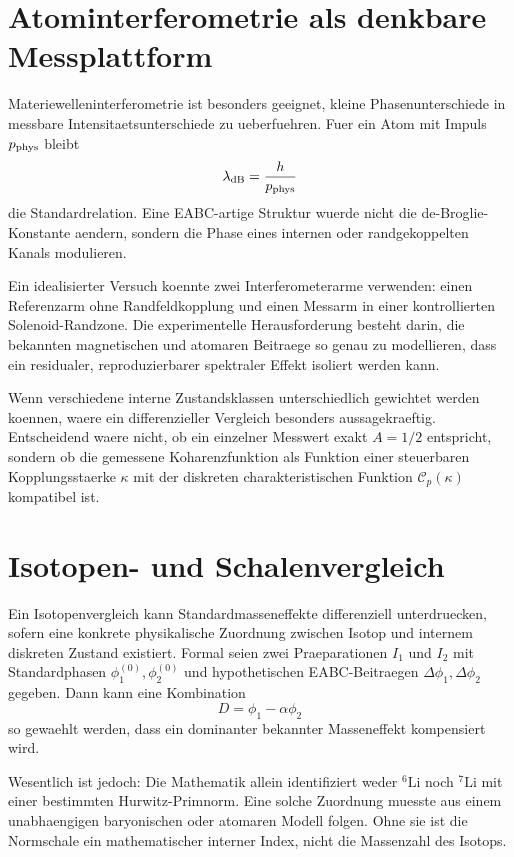 \documentclass[11pt,a4paper]{article}
\theoremstyle{definition}
\begin{document}
\section{Atominterferometrie als denkbare Messplattform}
Materiewelleninterferometrie ist besonders geeignet, kleine Phasenunterschiede in messbare Intensitaetsunterschiede zu ueberfuehren. Fuer ein Atom mit Impuls $p_{\rm phys}$ bleibt
\[
\lambda_{\rm dB}=\frac{h}{p_{\rm phys}}
\]
die Standardrelation. Eine EABC-artige Struktur wuerde nicht die de-Broglie-Konstante aendern, sondern die Phase eines internen oder randgekoppelten Kanals modulieren.

Ein idealisierter Versuch koennte zwei Interferometerarme verwenden: einen Referenzarm ohne Randfeldkopplung und einen Messarm in einer kontrollierten Solenoid-Randzone. Die experimentelle Herausforderung besteht darin, die bekannten magnetischen und atomaren Beitraege so genau zu modellieren, dass ein residualer, reproduzierbarer spektraler Effekt isoliert werden kann.

Wenn verschiedene interne Zustandsklassen unterschiedlich gewichtet werden koennen, waere ein differenzieller Vergleich besonders aussagekraeftig. Entscheidend waere nicht, ob ein einzelner Messwert exakt $A=1/2$ entspricht, sondern ob die gemessene Koharenzfunktion als Funktion einer steuerbaren Kopplungsstaerke $\kappa$ mit der diskreten charakteristischen Funktion $\mathcal C_p(\kappa)$ kompatibel ist.

\section{Isotopen- und Schalenvergleich}
Ein Isotopenvergleich kann Standardmasseneffekte differenziell unterdruecken, sofern eine konkrete physikalische Zuordnung zwischen Isotop und internem diskreten Zustand existiert. Formal seien zwei Praeparationen $I_1$ und $I_2$ mit Standardphasen $\phi^{(0)}_1,\phi^{(0)}_2$ und hypothetischen EABC-Beitraegen $\Delta\phi_1,\Delta\phi_2$ gegeben. Dann kann eine Kombination
\[
D=\phi_1-\alpha\phi_2
\]
so gewaehlt werden, dass ein dominanter bekannter Masseneffekt kompensiert wird.

Wesentlich ist jedoch: Die Mathematik allein identifiziert weder $^6\mathrm{Li}$ noch $^7\mathrm{Li}$ mit einer bestimmten Hurwitz-Primnorm. Eine solche Zuordnung muesste aus einem unabhaengigen baryonischen oder atomaren Modell folgen. Ohne sie ist die Normschale ein mathematischer interner Index, nicht die Massenzahl des Isotops.
\end{document}
